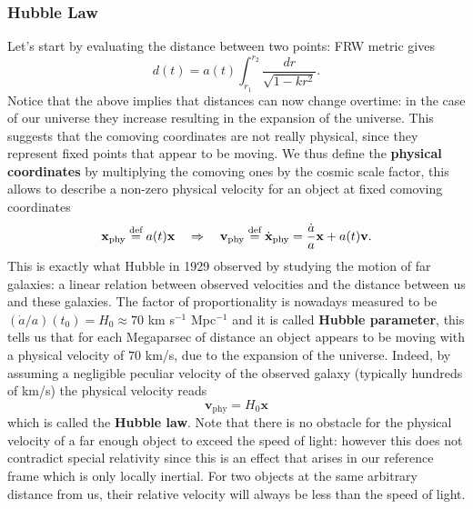 \subsubsection{Hubble Law}
Let's start by evaluating the distance between two points: FRW metric gives 
$$d(t)=a(t)\int_{r_1}^{r_2}\frac{dr}{\sqrt{1-kr^2}}.$$
Notice that the above implies that distances can now change overtime: in the case of our universe they increase resulting in the expansion of the universe. This suggests that the comoving coordinates are not really physical, since they represent fixed points that appear to be moving. We thus define the \textbf{physical coordinates} by multiplying the comoving ones by the cosmic scale factor, this allows to describe a non-zero physical velocity for an object at fixed comoving coordinates
$$\mathbf{x}_\text{phy}\stackrel{\text{def}}{=} a(t)\mathbf{x} \quad\Rightarrow\quad \mathbf{v}_\text{phy}\stackrel{\text{def}}{=}\dot{\mathbf{x}}_\text{phy}=\frac{\dot a}{a} \mathbf{x}+a(t)\mathbf{v}.$$
This is exactly what Hubble in 1929 \cite{1929PNAS...15..168H} observed by studying the motion of far galaxies: a linear relation between observed velocities and the distance between us and these galaxies. The factor of proportionality is nowadays measured to be $(\dot a/a)(t_0)=H_0\approx70$ km s$^{-1}$ Mpc$^{-1}$ and it is called \textbf{Hubble parameter}, this tells us that for each Megaparsec of distance an object appears to be moving with a physical velocity of $70$ km/s, due to the expansion of the universe. Indeed, by assuming a negligible peculiar velocity of the observed galaxy (typically hundreds of km/s) the physical velocity reads
\begin{equation}
    \label{eq:Hubble_Law}
    \mathbf{v}_\text{phy}=H_0\mathbf{x}
\end{equation}
which is called the \textbf{Hubble law}. Note that there is no obstacle for the physical velocity of a far enough object to exceed the speed of light: however this does not contradict special relativity since this is an effect that arises in our reference frame which is only locally inertial. For two objects at the same arbitrary distance from us, their relative velocity will always be less than the speed of light.
